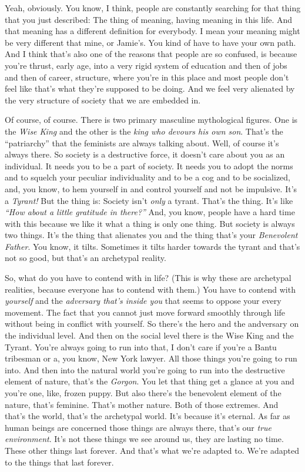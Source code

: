 \documentclass{memoir}
\newcommand{\qq}[1]{\emph{“#1”}}
\begin{document}
\begin{drama}
\jrspeaks Yeah, obviously. You know, I think, people are constantly searching for that thing that you just described: The thing of meaning, having meaning in this life. And that meaning has a different definition for everybody. I mean your meaning might be very different that mine, or Jamie's. You kind of have to have your own path. And I think that's also one of the reasons that people are so confused, is because you're thrust, early age, into a very rigid system of education and then of jobs and then of career, structure, where you're in this place and most people don't feel like that's what they're supposed to be doing. And we feel very alienated by the very structure of society that we are embedded in.

		\jpspeaks Of course, of course. There is two primary masculine mythological figures. One is the \emph{Wise King} and the other is the \emph{king who devours his own son}. That's the “patriarchy” that the feminists are always talking about. Well, of course it's always there. So society is a destructive force, it doesn't care about you as an individual. It needs you to be a part of society. It needs you to adopt the norms and to squelch your peculiar individuality and to be a cog and to be socialized, and, you know, to hem yourself in and control yourself and not be impulsive. It's a \emph{Tyrant!} But the thing is: Society isn't \emph{only} a tyrant. That's the thing. It's like \qq{How about a little gratitude in there?} And, you know, people have a hard time with this because we like it what a thing is only one thing. But society is always two things. It's the thing that alienates you and the thing that's your \emph{Benevolent Father}. You know, it tilts. Sometimes it tilts harder towards the tyrant and that's not so good, but that's an archetypal reality.

		So, what do you have to contend with in life? (This is why these are archetypal realities, because everyone has to contend with them.) You have to contend with \emph{yourself} and the \emph{adversary that's inside you} that seems to oppose your every movement. The fact that you cannot just move forward smoothly through life without being in conflict with yourself. So there's the hero and the andversary on the individual level. And then on the social level there is the Wise King and the Tyrant. You're always going to run into that, I don't care if you're a Bantu tribesman or a, you know, New York lawyer. All those things you're going to run into. And then into the natural world you're going to run into the destructive element of nature, that's the \emph{Gorgon}. You let that thing get a glance at you and you're one, like, frozen puppy. But also there's the benevolent element of the nature, that's feminine. That's mother nature. Both of those extremes. And that's the world, that's the archetypal world. It's because it's eternal. As far as human beings are concerned those things are always there, that's our \emph{true environment}. It's not these things we see around us, they are lasting no time. These other things last forever. And that's what we're adapted to. We're adapted to the things that last forever.


\end{drama}
\end{document}
